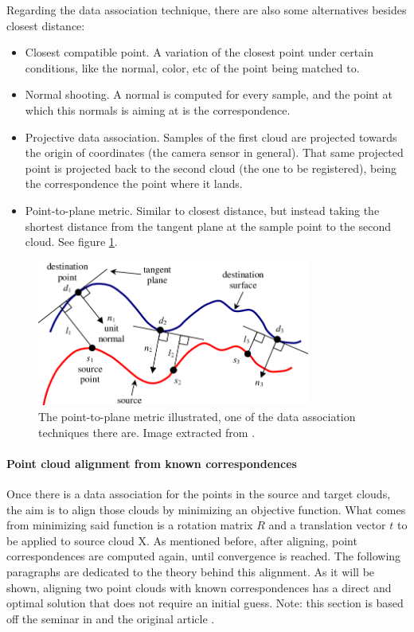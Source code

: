 \documentclass[../main.tex]{subfiles}
\begin{document}
Regarding the data association technique, there are also some alternatives besides closest distance:
\begin{itemize}
    \item Closest compatible point. A variation of the closest point under certain conditions, like the normal, color, etc of the point being matched to.
    \item Normal shooting. A normal is computed for every sample, and the point at which this normals is aiming at is the correspondence.
    \item Projective data association. Samples of the first cloud are projected towards the origin of coordinates (the camera sensor in general). That same projected point is projected back to the second cloud (the one to be registered), being the correspondence the point where it lands.
    \item Point-to-plane metric. Similar to closest distance, but instead taking the shortest distance from the tangent plane at the sample point to the second cloud. See figure \ref{fig:icp_point_to_plane}.
\end{itemize}
\begin{figure}[htbp]
    \centering
    \includegraphics[width=0.8\textwidth]{images/icp_point_to_plane.png}
    \caption{The point-to-plane metric illustrated, one of the data association techniques there are. Image extracted from \cite{icp_point_to_plane_Low}.}
    \label{fig:icp_point_to_plane}
\end{figure}

\paragraph{Point cloud alignment from known correspondences} Once there is a data association for the points in the source and target clouds, the aim is to align those clouds by minimizing an objective function. What comes from minimizing said function is a rotation matrix $R$ and a translation vector $t$ to be applied to source cloud X. As mentioned before, after aligning, point correspondences are computed again, until convergence is reached. The following paragraphs are dedicated to the theory behind this alignment. As it will be shown, aligning two point clouds with known correspondences has a direct and optimal solution that does not require an initial guess. Note: this section is based off the seminar in \cite{stachniss_known_data_association} and the original article \cite{least_squares_3D_point_sets_Arun}.
\end{document}
